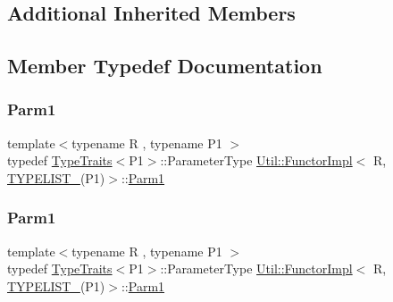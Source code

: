 \subsection*{Additional Inherited Members}


\subsection{Member Typedef Documentation}
\mbox{\label{classUtil_1_1FunctorImpl_3_01R_00_01TYPELIST__1_07P1_08_4_a907de03623e2a575252ce08c64b52a8d}} 
\subsubsection{\texorpdfstring{Parm1}{Parm1}\hspace{0.1cm}{\footnotesize\ttfamily [1/3]}}
{\footnotesize\ttfamily template$<$typename R , typename P1 $>$ \\
typedef \mbox{\hyperlink{classUtil_1_1TypeTraits}{Type\+Traits}}$<$P1$>$\+::Parameter\+Type \mbox{\hyperlink{classUtil_1_1FunctorImpl}{Util\+::\+Functor\+Impl}}$<$ R, \mbox{\hyperlink{adat__devel__install_2include_2adat_2typelist_8h_a6a7a6aa3dece450c8d239713e2952df7}{T\+Y\+P\+E\+L\+I\+S\+T\+\_}}(P1)$>$\+::\mbox{\hyperlink{structUtil_1_1Private_1_1FunctorImplBase_a9d61e693d6c616dea5bd9d9073c7d21a}{Parm1}}}

\mbox{\label{classUtil_1_1FunctorImpl_3_01R_00_01TYPELIST__1_07P1_08_4_a907de03623e2a575252ce08c64b52a8d}} 
\subsubsection{\texorpdfstring{Parm1}{Parm1}\hspace{0.1cm}{\footnotesize\ttfamily [2/3]}}
{\footnotesize\ttfamily template$<$typename R , typename P1 $>$ \\
typedef \mbox{\hyperlink{classUtil_1_1TypeTraits}{Type\+Traits}}$<$P1$>$\+::Parameter\+Type \mbox{\hyperlink{classUtil_1_1FunctorImpl}{Util\+::\+Functor\+Impl}}$<$ R, \mbox{\hyperlink{adat__devel__install_2include_2adat_2typelist_8h_a6a7a6aa3dece450c8d239713e2952df7}{T\+Y\+P\+E\+L\+I\+S\+T\+\_}}(P1)$>$\+::\mbox{\hyperlink{structUtil_1_1Private_1_1FunctorImplBase_a9d61e693d6c616dea5bd9d9073c7d21a}{Parm1}}}


